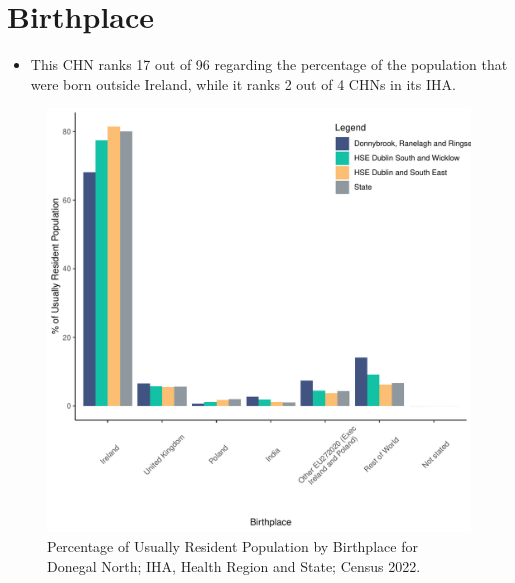 \documentclass{article}
\begin{document}
\section{Birthplace}\label{sect:Birth}
\begin{itemize}
\item This CHN ranks  17 out of 96 regarding the percentage of the population that were born outside Ireland, while it ranks  2 out of 4 CHNs in its IHA.
\end{itemize}
\begin{figure}[H]
	\centering
	\includegraphics[width = 130mm]{../figures/BirthED.pdf}
	\caption{Percentage of Usually Resident Population by Birthplace for Donegal North; IHA, Health Region and State; Census 2022.}
	\label{fig:vbnv}
	\end{figure}
	
\end{document}
